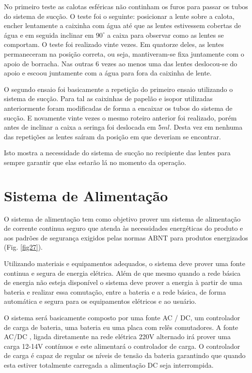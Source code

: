 No primeiro teste as calotas esféricas não continham os furos para passar os tubos do sistema de sucção. O teste foi o seguinte: posicionar a lente sobre a calota, encher lentamente a caixinha com água até que as lentes estivessem cobertas de água e em seguida inclinar em $90^\circ$ a caixa para observar como as lentes se comportam. O teste foi realizado vinte vezes. Em quatorze deles, as lentes permaneceram na posição correta, ou seja, mantiveram-se fixa juntamente com o apoio de borracha. Nas outras 6 vezes ao menos uma das lentes deslocou-se do apoio e escoou juntamente com a água para fora da caixinha de lente.

O segundo ensaio foi basicamente a repetição do primeiro ensaio utilizando o sistema de sucção.  Para tal as caixinhas de papelão e isopor utilizadas anteriormente foram modificadas de forma a encaixar os tubos do sistema de sucção. E novamente vinte vezes o mesmo roteiro anterior foi realizado, porém antes de inclinar a caixa a seringa foi deslocada em 5$ml$. Desta vez em nenhuma das repetições as lentes saíram da posição em que deveriam se encontrar.

Isto mostra a necessidade do sistema de sucção no recipiente das lentes para sempre garantir que elas estarão lá no momento da operação.





\section[Sistema de Alimentação]{Sistema de Alimentação}

O sistema de alimentação tem como objetivo prover um sistema de alimentação de corrente continua seguro que atenda às necessidades energéticas do produto e aos padrões de segurança exigidos pelas normas ABNT para produtos energizados (Fig. \ref{fig27}).

Utilizando materiais e equipamentos adequados, o sistema deve prover uma fonte continua e segura de energia elétrica. Além de que mesmo quando a rede básica de energia não esteja disponível o sistema deve prover a energia à partir de uma bateria e realizar essa comutação, entre a bateria e a rede básica, de forma automática e segura para os equipamentos elétricos e ao usuário.

O sistema será basicamente composto por uma fonte AC / DC, um controlador de carga de bateria, uma bateria eu uma placa com relês comutadores. A fonte  AC/DC , ligada diretamente na  rede elétrica 220V alternado irá prover uma carga 12-14V contínuos e este alimentará o controlador de carga. O controlador de carga é capaz de regular os níveis de tensão da bateria garantindo que quando esta estiver totalmente carregada a alimentação DC seja interrompida.


